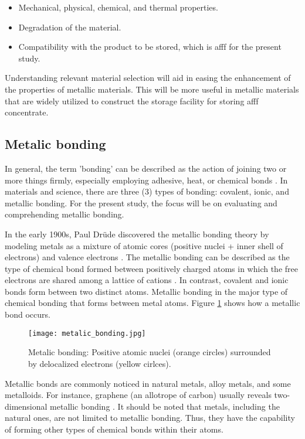 \begin{itemize}
    \item Mechanical, physical, chemical, and thermal properties.
    \item Degradation of the material.
    \item Compatibility with the product to be stored, which is \acrshort{afff} for the present study.
\end{itemize}

Understanding relevant material selection will aid in easing the enhancement of the properties of metallic materials. This will be more useful in metallic materials that are widely utilized to construct the storage facility for storing \acrshort{afff} concentrate. 

\subsection{Metalic bonding}
In general, the term 'bonding' can be described as the action of joining two or more things firmly, especially employing adhesive, heat, or chemical bonds \cite{soler2000metallic}. In materials and science, there are three (3) types of bonding: covalent, ionic, and metallic bonding. For the present study, the focus will be on evaluating and comprehending metallic bonding.

In the early 1900s, Paul Drüde discovered the metallic bonding theory by modeling metals as a mixture of atomic cores (positive nuclei + inner shell of electrons) and valence electrons \cite{sinex2017general}. The metallic bonding can be described as the type of chemical bond formed between positively charged atoms in which the free electrons are shared among a lattice of cations \cite{lepetit2017topological}. In contrast, covalent and ionic bonds form between two distinct atoms. Metallic bonding in the major type of chemical bonding that forms between metal atoms. Figure \ref{ch3:figure:bonding} shows how a metallic bond occurs.

\begin{figure}[H]
    \centering
    \texttt{[image: metalic\_bonding.jpg]}
    \caption{Metalic bonding: Positive atomic nuclei (orange circles) surrounded by delocalized electrons (yellow cirlces)\cite{soler2000metallic}.}
    \label{ch3:figure:bonding}
\end{figure}


Metallic bonds are commonly noticed in natural metals, alloy metals, and some metalloids. For instance, graphene (an allotrope of carbon) usually reveals two-dimensional metallic bonding \cite{lepetit2017topological}. It should be noted that metals, including the natural ones, are not limited to metallic bonding. Thus, they have the capability of forming other types of chemical bonds within their atoms.

